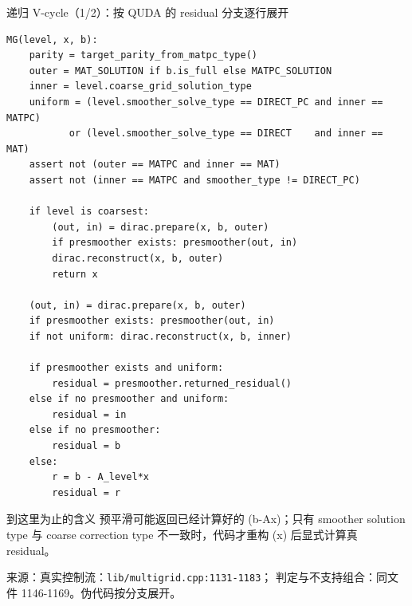 \documentclass[UTF8,aspectratio=169,11pt]{ctexbeamer}
\newcommand{\source}[1]{\vspace{0.05em}\par{\raggedright\scriptsize\color{muted}来源：#1\par}}
\newcommand{\codepath}[1]{\nolinkurl{#1}}
\begin{document}
\begin{frame}[fragile,t]{递归 V-cycle（1/2）：按 QUDA 的 residual 分支逐行展开}
  \begin{lstlisting}[firstnumber=1]
MG(level, x, b):
    parity = target_parity_from_matpc_type()
    outer = MAT_SOLUTION if b.is_full else MATPC_SOLUTION
    inner = level.coarse_grid_solution_type
    uniform = (level.smoother_solve_type == DIRECT_PC and inner == MATPC)
           or (level.smoother_solve_type == DIRECT    and inner == MAT)
    assert not (outer == MATPC and inner == MAT)
    assert not (inner == MATPC and smoother_type != DIRECT_PC)

    if level is coarsest:
        (out, in) = dirac.prepare(x, b, outer)
        if presmoother exists: presmoother(out, in)
        dirac.reconstruct(x, b, outer)
        return x

    (out, in) = dirac.prepare(x, b, outer)
    if presmoother exists: presmoother(out, in)
    if not uniform: dirac.reconstruct(x, b, inner)

    if presmoother exists and uniform:
        residual = presmoother.returned_residual()
    else if no presmoother and uniform:
        residual = in
    else if no presmoother:
        residual = b
    else:
        r = b - A_level*x
        residual = r
  \end{lstlisting}
  \vspace{0.04cm}
  \begin{block}{到这里为止的含义}
    预平滑可能返回已经计算好的 (b-Ax)；只有 smoother solution type 与 coarse correction type 不一致时，代码才重构 (x) 后显式计算真 residual。
  \end{block}
  \source{真实控制流：\codepath{lib/multigrid.cpp:1131-1183}；\texttt{\detokenize{uniform}} 判定与不支持组合：同文件 1146-1169。伪代码按分支展开。}
\end{frame}
\end{document}

